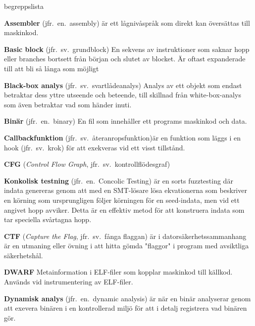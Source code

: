 \begin{labeling}{begreppslista}

    \item [\textbf{Assembler}] (jfr.\ en.\ assembly) är ett
    lågnivåspråk som direkt kan översättas till maskinkod.

    \item[\textbf{Basic block}] (jfr.\ sv.\ grundblock) En sekvens av
    instruktioner som saknar hopp eller branches bortsett från
    början och slutet av blocket. Är oftast expanderade till att
    bli så långa som möjligt

    \item [\textbf{Black-box analys}] (jfr.\ sv.\ svartlådeanalys)
    Analys av ett objekt som endast betraktar dess yttre utseende
    och beteende, till skillnad från white-box-analys som även
    betraktar vad som händer inuti.

    \item [\textbf{Binär}] (jfr.\ en.\ binary)  En fil som innehåller ett
    programs maskinkod och data.

    \item [\textbf{Callbackfunktion}] (jfr.\ sv.\ återanropsfunktion)är en funktion
    som läggs i en hook (jfr.\ sv.\ krok) för att exekveras vid
    ett visst tillstånd.

    \item [\textbf{CFG}] (\emph{Control Flow Graph},
          jfr.\ sv.\ kontrollflödesgraf)

    \item [\textbf{Konkolisk testning}] (jfr.\ en.\ Concolic Testing)
    är en sorts fuzztesting där indata genereras genom att med en
    SMT-lösare lösa ekvationerna som beskriver en körning som
    ursprungligen följer körningen för en seed-indata, men vid ett
    angivet hopp avviker. Detta är en effektiv metod för att
    konstruera indata som tar speciella svårtagna hopp.

    \item [\textbf{CTF}] (\emph{Capture the Flag}, jfr.\ sv.\ fånga
          flaggan) är i datorsäkerhetssammanhang är en utmaning eller
    övning i att hitta gömda "flaggor" i program med avsiktliga
    säkerhetshål.

    \item [\textbf{DWARF}] Metainformation i ELF-filer som kopplar
    maskinkod till källkod. Används vid instrumentering av
    ELF-filer.

    \item [\textbf{Dynamisk analys}] (jfr.\ en.\ dynamic analysis) är
    när en binär analyserar genom att exevera binären i en
    kontrollerad miljö för att i detalj registrera vad binären
    gör.


\end{labeling}
